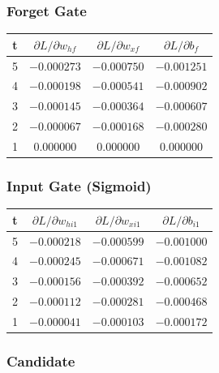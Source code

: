 \documentclass[12pt]{article}
\begin{document}
\subsubsection*{Forget Gate}

\begin{center}
\scriptsize
\begin{tabular}{cccc}
\toprule
\textbf{t} & \textbf{$\partial L / \partial w_{hf}$} & \textbf{$\partial L / \partial w_{xf}$} & \textbf{$\partial L / \partial b_f$} \\
\midrule
5 & $-0.000273$ & $-0.000750$ & $-0.001251$ \\
4 & $-0.000198$ & $-0.000541$ & $-0.000902$ \\
3 & $-0.000145$ & $-0.000364$ & $-0.000607$ \\
2 & $-0.000067$ & $-0.000168$ & $-0.000280$ \\
1 & $0.000000$ & $0.000000$ & $0.000000$ \\
\bottomrule
\end{tabular}
\end{center}

\subsubsection*{Input Gate (Sigmoid)}

\begin{center}
\scriptsize
\begin{tabular}{cccc}
\toprule
\textbf{t} & \textbf{$\partial L / \partial w_{hi1}$} & \textbf{$\partial L / \partial w_{xi1}$} & \textbf{$\partial L / \partial b_{i1}$} \\
\midrule
5 & $-0.000218$ & $-0.000599$ & $-0.001000$ \\
4 & $-0.000245$ & $-0.000671$ & $-0.001082$ \\
3 & $-0.000156$ & $-0.000392$ & $-0.000652$ \\
2 & $-0.000112$ & $-0.000281$ & $-0.000468$ \\
1 & $-0.000041$ & $-0.000103$ & $-0.000172$ \\
\bottomrule
\end{tabular}
\end{center}

\subsubsection*{Candidate}
\end{document}
